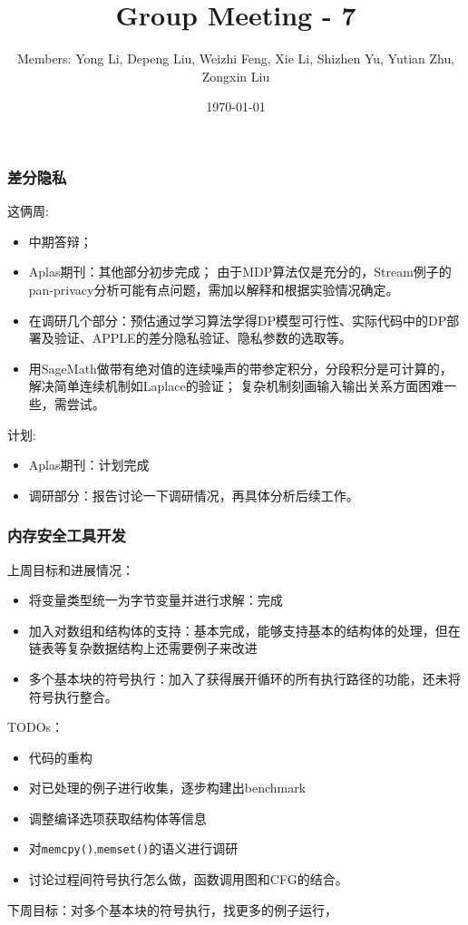 \documentclass[aspectratio=1610, 13pt]{beamer}
\title{Group Meeting - 7}
\date{\today}
\author{Members: Yong Li, Depeng Liu, Weizhi Feng, Xie Li, Shizhen Yu, Yutian Zhu, Zongxin Liu}
\begin{document}
\maketitle
\begin{frame}\frametitle{差分隐私}
这俩周:
\begin{itemize}
  \item 中期答辩；
  \item Aplas期刊：其他部分初步完成；
  由于MDP算法仅是充分的，Stream例子的pan-privacy分析可能有点问题，需加以解释和根据实验情况确定。
  \item 在调研几个部分：预估通过学习算法学得DP模型可行性、实际代码中的DP部署及验证、APPLE的差分隐私验证、隐私参数的选取等。
  \item 用SageMath做带有绝对值的连续噪声的带参定积分，分段积分是可计算的，解决简单连续机制如Laplace的验证；
  复杂机制刻画输入输出关系方面困难一些，需尝试。
\end{itemize}

计划:
\begin{itemize}
  \item Aplas期刊：计划完成
  \item 调研部分：报告讨论一下调研情况，再具体分析后续工作。
\end{itemize}
\end{frame}

\begin{frame}\frametitle{内存安全工具开发}

上周目标和进展情况：
\begin{itemize}
\item 将变量类型统一为字节变量并进行求解：完成
\item 加入对数组和结构体的支持：基本完成，能够支持基本的结构体的处理，但在链表等复杂数据结构上还需要例子来改进
\item 多个基本块的符号执行：加入了获得展开循环的所有执行路径的功能，还未将符号执行整合。
\end{itemize}
TODOs：
\begin{itemize}
\small
\item 代码的重构
\item 对已处理的例子进行收集，逐步构建出benchmark
\item 调整编译选项获取结构体等信息
\item 对\texttt{memcpy()},\texttt{memset()}的语义进行调研
\item 讨论过程间符号执行怎么做，函数调用图和CFG的结合。

\end{itemize}

下周目标：对多个基本块的符号执行，找更多的例子运行，

 \end{frame}
 
\end{document}
